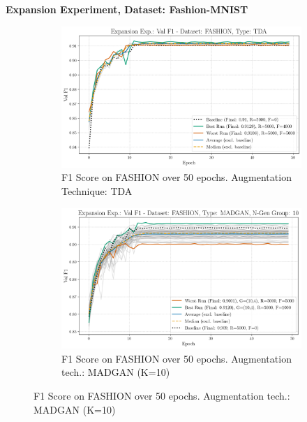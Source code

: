 \newpage
\noindent\textbf{Expansion Experiment, Dataset: Fashion-MNIST}
\begin{figure}[H]
	\centering
	\begin{subfigure}{.85\textwidth}
		\includegraphics[width=\textwidth]{abb/strat_classifier_performance/tda_fashion_mnist/expansion_experiments/val_f1_score_tda_fashion_mnist_fashion_all.png}
		\caption{F1 Score on FASHION over 50 epochs. Augmentation Technique: TDA} 
        \label{fig:res_expansion_fashion_tda_vs_madgan__tda}
	\end{subfigure}
	\begin{subfigure}{.85\textwidth}
		\includegraphics[width=\textwidth]{abb/strat_classifier_performance/FASHION_STRATIFIED_CLASSIFIERS_MADGAN_NEW/expansion_experiments/val_f1_score_MADGAN_FASHION_n_gen_10_all.png}
		\caption{F1 Score on FASHION over 50 epochs. Augmentation tech.: MADGAN (K=10)} 
        \label{fig:res_expansion_fashion_tda_vs_madgan__madgan}
	\end{subfigure}
\end{figure}

